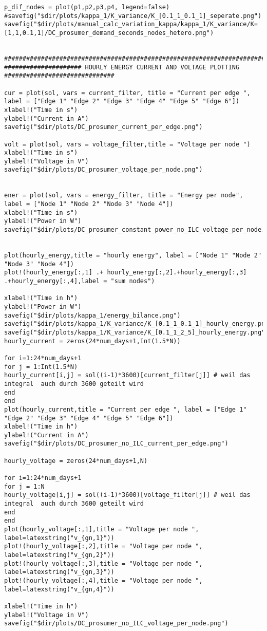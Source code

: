 \begin{lstlisting}
p_dif_nodes = plot(p1,p2,p3,p4, legend=false)
#savefig("$dir/plots/kappa_1/K_variance/K_[0.1_1_0.1_1]_seperate.png")
savefig("$dir/plots/manual_calc_variation_kappa/kappa_1/K_variance/K=[1,1,0.1,1]/DC_prosumer_demand_seconds_nodes_hetero.png")


#################################################################################
##################### HOURLY ENERGY CURRENT AND VOLTAGE PLOTTING ##############################

cur = plot(sol, vars = current_filter, title = "Current per edge ", label = ["Edge 1" "Edge 2" "Edge 3" "Edge 4" "Edge 5" "Edge 6"])
xlabel!("Time in s")
ylabel!("Current in A")
savefig("$dir/plots/DC_prosumer_current_per_edge.png")

volt = plot(sol, vars = voltage_filter,title = "Voltage per node ")
xlabel!("Time in s")
ylabel!("Voltage in V")
savefig("$dir/plots/DC_prosumer_voltage_per_node.png")


ener = plot(sol, vars = energy_filter, title = "Energy per node", label = ["Node 1" "Node 2" "Node 3" "Node 4"])
xlabel!("Time in s")
ylabel!("Power in W")
savefig("$dir/plots/DC_prosumer_constant_power_no_ILC_voltage_per_node.png")


plot(hourly_energy,title = "hourly energy", label = ["Node 1" "Node 2" "Node 3" "Node 4"])
plot!(hourly_energy[:,1] .+ hourly_energy[:,2].+hourly_energy[:,3] .+hourly_energy[:,4],label = "sum nodes")

xlabel!("Time in h")
ylabel!("Power in W")
savefig("$dir/plots/kappa_1/energy_bilance.png")
savefig("$dir/plots/kappa_1/K_variance/K_[0.1_1_0.1_1]_hourly_energy.png")
savefig("$dir/plots/kappa_1/K_variance/K_[0.1_1_2_5]_hourly_energy.png")
hourly_current = zeros(24*num_days+1,Int(1.5*N))

for i=1:24*num_days+1
for j = 1:Int(1.5*N)
hourly_current[i,j] = sol((i-1)*3600)[current_filter[j]] # weil das integral  auch durch 3600 geteilt wird
end
end
plot(hourly_current,title = "Current per edge ", label = ["Edge 1" "Edge 2" "Edge 3" "Edge 4" "Edge 5" "Edge 6"])
xlabel!("Time in h")
ylabel!("Current in A")
savefig("$dir/plots/DC_prosumer_no_ILC_current_per_edge.png")

hourly_voltage = zeros(24*num_days+1,N)

for i=1:24*num_days+1
for j = 1:N
hourly_voltage[i,j] = sol((i-1)*3600)[voltage_filter[j]] # weil das integral  auch durch 3600 geteilt wird
end
end
plot(hourly_voltage[:,1],title = "Voltage per node ", label=latexstring("v_{gn,1}"))
plot!(hourly_voltage[:,2],title = "Voltage per node ", label=latexstring("v_{gn,2}"))
plot!(hourly_voltage[:,3],title = "Voltage per node ", label=latexstring("v_{gn,3}"))
plot!(hourly_voltage[:,4],title = "Voltage per node ", label=latexstring("v_{gn,4}"))

xlabel!("Time in h")
ylabel!("Voltage in V")
savefig("$dir/plots/DC_prosumer_no_ILC_voltage_per_node.png")

\end{lstlisting}
